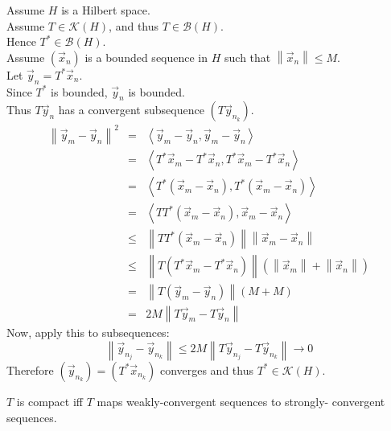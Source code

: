 \documentclass[letterpaper,12pt,fleqn]{article}
\newcommand{\vx}{\vec{x}}
\newcommand{\vy}{\vec{y}}
\newcommand{\norm}[1]{\left\|#1\right\|}
\newcommand{\inner}[1]{\left<#1\right>}
\newcommand{\mb}{\mathcal{B}}
\newcommand{\mk}{\mathcal{K}}
\begin{document}
\begin{theproof}
  Assume $H$ is a Hilbert space. \\
  Assume $T\in\mk(H)$, and thus $T\in\mb(H)$. \\
  Hence $T^*\in\mb(H)$. \\
  Assume $(\vx_n)$ is a bounded sequence in $H$ such that
  $\norm{\vx_n}\le M$. \\
  Let $\vy_n=T^*\vx_n$. \\
  Since $T^*$ is bounded, $\vy_n$ is bounded. \\
  Thus $T\vy_n$ has a convergent subsequence $(T\vy_{n_k})$.
  \begin{eqnarray*}
    \norm{\vy_m-\vy_n}^2 &=& \inner{\vy_m-\vy_n,\vy_m-\vy_n} \\
    &=& \inner{T^*\vx_m-T^*\vx_n,T^*\vx_m-T^*\vx_n} \\
    &=& \inner{T^*(\vx_m-\vx_n),T^*(\vx_m-\vx_n)} \\
    &=& \inner{TT^*(\vx_m-\vx_n),\vx_m-\vx_n} \\
    &\le& \norm{TT^*(\vx_m-\vx_n)}\norm{\vx_m-\vx_n} \\
    &\le& \norm{T(T^*\vx_m-T^*\vx_n)}(\norm{\vx_m}+\norm{\vx_n}) \\
    &=& \norm{T(\vy_m-\vy_n)}(M+M) \\
    &=& 2M\norm{T\vy_m-T\vy_n}
  \end{eqnarray*}
  Now, apply this to subsequences:
  \[\norm{\vy_{n_j}-\vy_{n_k}}\le2M\norm{T\vy_{n_j}-T\vy_{n_k}}\to0\]
  Therefore $(\vy_{n_k})=(T^*\vx_{n_k})$ converges and thus $T^*\in\mk(H)$.
\end{theproof}

\begin{theorem}
  $T$ is compact iff $T$ maps weakly-convergent sequences to strongly-
  convergent sequences.
\end{theorem}
\end{document}
